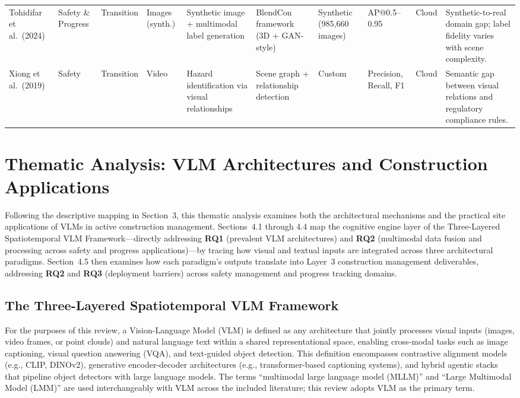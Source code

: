 \documentclass[10pt,letterpaper]{article}
\begin{document}
\begin{landscape}
\begin{longtable}{L{2.8cm} L{1.7cm} L{2.0cm} L{2.5cm} L{1.5cm} L{3.0cm} L{1.8cm} L{2.0cm} L{1.6cm} L{3.2cm}}
Tohidifar et al.\ (2024) & Safety \& Progress & Transition & Images (synth.) & Synthetic image + multimodal label generation & BlendCon framework (3D + GAN-style) & Synthetic (985,660 images) & AP@0.5--0.95 & Cloud & Synthetic-to-real domain gap; label fidelity varies with scene complexity.\\

Xiong et al.\ (2019) & Safety & Transition & Video & Hazard identification via visual relationships & Scene graph + relationship detection & Custom & Precision, Recall, F1 & Cloud & Semantic gap between visual relations and regulatory compliance rules.\\

\end{longtable}
\end{landscape}

\section{Thematic Analysis: VLM Architectures and Construction Applications}

Following the descriptive mapping in Section~3, this thematic analysis examines both the architectural mechanisms and the practical site applications of VLMs in active construction management. Sections~4.1 through 4.4 map the cognitive engine layer of the Three-Layered Spatiotemporal VLM Framework---directly addressing \textbf{RQ1} (prevalent VLM architectures) and \textbf{RQ2} (multimodal data fusion and processing across safety and progress applications)---by tracing how visual and textual inputs are integrated across three architectural paradigms. Section~4.5 then examines how each paradigm's outputs translate into Layer~3 construction management deliverables, addressing \textbf{RQ2} and \textbf{RQ3} (deployment barriers) across safety management and progress tracking domains.

\subsection{The Three-Layered Spatiotemporal VLM Framework}

For the purposes of this review, a Vision-Language Model (VLM) is defined as any architecture that jointly processes visual inputs (images, video frames, or point clouds) and natural language text within a shared representational space, enabling cross-modal tasks such as image captioning, visual question answering (VQA), and text-guided object detection. This definition encompasses contrastive alignment models (e.g., CLIP, DINOv2), generative encoder-decoder architectures (e.g., transformer-based captioning systems), and hybrid agentic stacks that pipeline object detectors with large language models. The terms ``multimodal large language model (MLLM)'' and ``Large Multimodal Model (LMM)'' are used interchangeably with VLM across the included literature; this review adopts VLM as the primary term.
\end{document}
